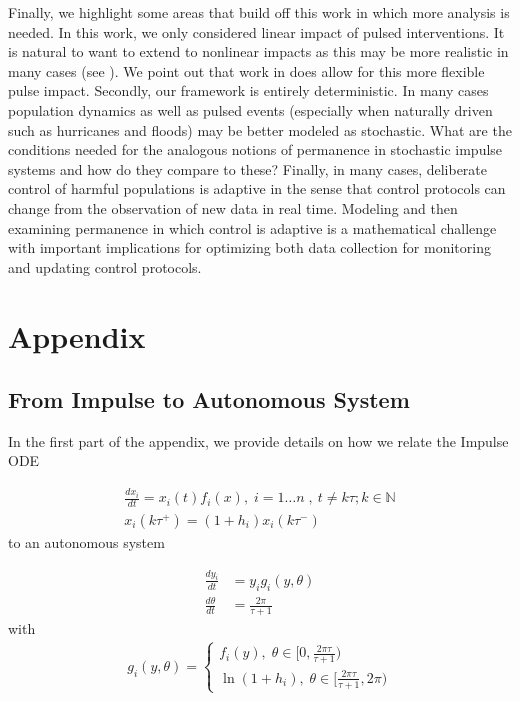 \documentclass{article}
\theoremstyle{definition}
\newcommand{\N}{{\mathbb{N}}}
\begin{document}
Finally, we highlight some areas that build off this work in which more analysis is needed.  
In this work, we only considered linear impact of pulsed interventions.  It is natural to want to extend to nonlinear impacts as this may be more realistic in many cases (see \cite{d2026dynamical}).  We point out that work in \cite{schreiber_flowkick_2025} does allow for this more flexible pulse impact.  Secondly, our framework is entirely deterministic.  In many cases population dynamics as well as pulsed events (especially when naturally driven such as hurricanes and floods) may be better modeled as stochastic.  What are the conditions needed for the analogous notions of permanence in stochastic impulse systems and how do they compare to these? Finally, in many cases, deliberate control of harmful populations is adaptive in the sense that control protocols can change from the observation of new data in real time.  Modeling and then examining permanence in which control is adaptive is a mathematical challenge with important implications for optimizing both data collection for monitoring and updating control protocols. 



\section{Appendix}

\subsection{From Impulse to Autonomous System}

In the first part of the appendix, we provide details on how we relate the Impulse ODE

\begin{equation} \label{appendix_eqn}
    \begin{split}
        \frac{dx_i}{dt} = x_i(t) f_i(x) ,\;  i = 1 \ldots n\; ,\ t \neq k\tau; k \in \N\\
        x_i(k\tau^+) = (1+h_i)x_i(k\tau^-)
    \end{split}
\end{equation}
to an autonomous system

\begin{align}
     \frac{dy_i}{dt} &= y_ig_i(y, \theta)\\
    \frac{d\theta}{dt} &=\frac{2\pi}{\tau+1} \label{auto_app}
\end{align}
with 
\begin{align}
    g_i(y, \theta) = \begin{cases}
        f_i(y), \; \theta \in [0,\frac{2\pi\tau}{\tau+1}) \\
        \ln(1+h_i), \; \theta \in [\frac{2\pi \tau}{\tau + 1},2\pi)
    \end{cases}
\end{align}
\end{document}
